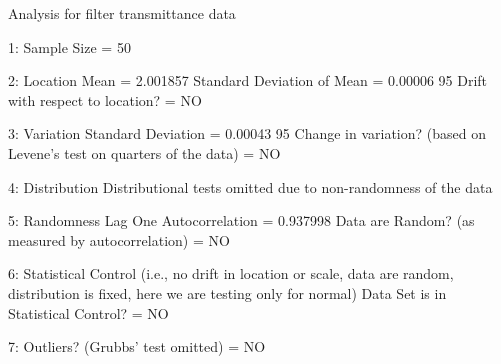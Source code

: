   
  
 Analysis for filter transmittance data
  
 1: Sample Size                           = 50
  
 2: Location
    Mean                                  = 2.001857
    Standard Deviation of Mean            = 0.00006
    95%
    Drift with respect to location?       = NO
  
 3: Variation
    Standard Deviation                    = 0.00043
    95%
    Change in variation?
    (based on Levene's test on quarters
    of the data)                          = NO
  
 4: Distribution
    Distributional tests omitted due to
    non-randomness of the data
  
 5: Randomness
    Lag One Autocorrelation               = 0.937998
    Data are Random?
      (as measured by autocorrelation)    = NO
  
 6: Statistical Control
    (i.e., no drift in location or scale,
    data are random, distribution is 
    fixed, here we are testing only for
    normal)
    Data Set is in Statistical Control?   = NO
  
 7: Outliers?
    (Grubbs' test omitted)                = NO
  
